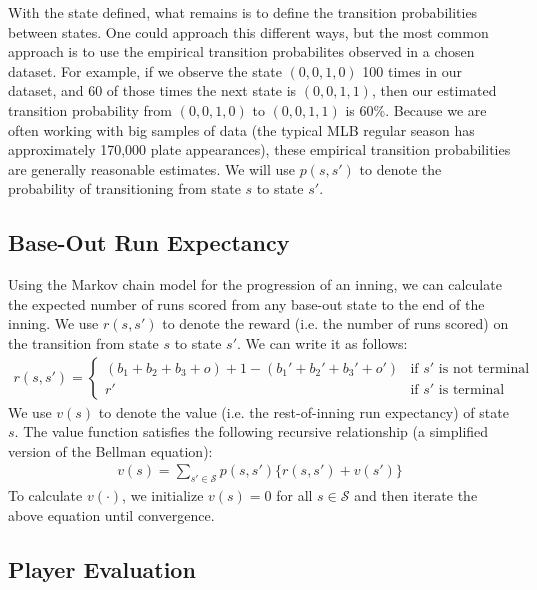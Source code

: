 \documentclass{article}
\begin{document}
      With the state defined, what remains is to define the transition probabilities between states. One could approach this different ways, but the most common approach is to use the empirical transition probabilites observed in a chosen dataset. For example, if we observe the state $(0, 0, 1, 0)$ 100 times in our dataset, and 60 of those times the next state is $(0, 0, 1, 1)$, then our estimated transition probability from $(0, 0, 1, 0)$ to $(0, 0, 1, 1)$ is 60\%. Because we are often working with big samples of data (the typical MLB regular season has approximately 170,000 plate appearances), these empirical transition probabilities are generally reasonable estimates. We will use $p(s, s')$ to denote the probability of transitioning from state $s$ to state $s'$.

    \subsection{\sc Base-Out Run Expectancy}

      Using the Markov chain model for the progression of an inning, we can calculate the expected number of runs scored from any base-out state to the end of the inning. We use $r(s, s')$ to denote the reward (i.e. the number of runs scored) on the transition from state $s$ to state $s'$. We can write it as follows:
      \begin{align*}
        r(s, s') = \begin{cases}
          (b_1 + b_2 + b_3 + o) + 1 - (b_1' + b_2' + b_3' + o') & \mbox{if $s'$ is not terminal}\\
          r' & \mbox{if $s'$ is terminal}
        \end{cases}
      \end{align*}
      We use $v(s)$ to denote the value (i.e. the rest-of-inning run expectancy) of state $s$. The value function satisfies the following recursive relationship (a simplified version of the Bellman equation):
      \begin{align*}
        v(s) = \sum_{s' \in \mathcal{S}} p(s, s') \{r(s, s') + v(s')\}
      \end{align*}
      To calculate $v(\cdot)$, we initialize $v(s) = 0$ for all $s \in \mathcal{S}$ and then iterate the above equation until convergence.

    \subsection{\sc Player Evaluation}
\end{document}
